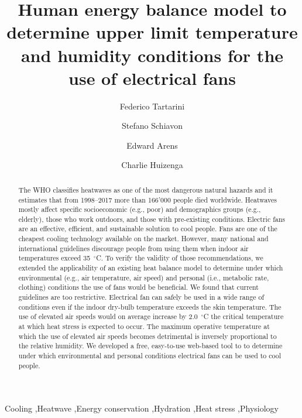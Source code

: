 
\begin{frontmatter}

\title{Human energy balance model to determine upper limit temperature and humidity conditions for the use of electrical fans}

\author[sinBerBest]{Federico Tartarini}
\author[CBE]{Stefano Schiavon}
\author[CBE]{Edward Arens}
\author[CBE]{Charlie Huizenga}


\address[sinBerBest]{SinBerBEST, Berkeley Education Alliance for Research in Singapore, Singapore}
\address[CBE]{Center for the Built Environment, University of California, Berkeley, USA}

\begin{abstract}
    The WHO classifies heatwaves as one of the most dangerous natural hazards and it estimates that from 1998--2017 more than 166'000 people died worldwide.
    Heatwaves mostly affect specific socioeconomic (e.g., poor) and demographics groups (e.g., elderly), those who work outdoors, and those with pre-existing conditions.
    Electric fans are an effective, efficient, and sustainable solution to cool people.
    Fans are one of the cheapest cooling technology available on the market.
    However, many national and international guidelines discourage people from using them when indoor air temperatures exceed 35~$^{\circ}$C\@.
    To verify the validity of those recommendations, we extended the applicability of an existing heat balance model to determine under which environmental (e.g., air temperature, air speed) and personal (i.e., metabolic rate, clothing) conditions the use of fans would be beneficial.
    We found that current guidelines are too restrictive. Electrical fan can safely be used in a wide range of conditions even if the indoor dry-bulb temperature exceeds the skin temperature.
    The use of elevated air speeds would on average increase by 2.0~$^{\circ}$C the critical temperature at which heat stress is expected to occur.
    The maximum operative temperature at which the use of elevated air speeds becomes detrimental is inversely proportional to the relative humidity.
    We developed a free, easy-to-use web-based tool to to determine under which environmental and personal conditions electrical fans can be used to cool people.
\end{abstract}

\begin{keyword}
Cooling \sep Heatwave \sep Energy conservation \sep Hydration \sep Heat stress \sep Physiology
\end{keyword}

\end{frontmatter}
